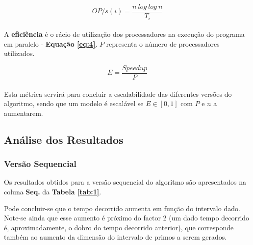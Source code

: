 \documentclass[a4paper]{article}
\begin{document}
\begin{equation}
\label{eq:3}
    OP/s(i) = \frac{n\ log\ log\ n}{T_i}
\end{equation}
\\

A \textbf{eficiência} é o rácio de utilização dos processadores na execução do programa em paralelo - \textbf{Equação \ref{eq:4}}. $P$ representa o número de processadores utilizados.

\begin{equation}
\label{eq:4}
    E = \frac{Speedup}{P}
\end{equation}
\\

Esta métrica servirá para concluir a escalabilidade das diferentes versões do algoritmo, sendo que um modelo é escalável se $E \in [0, 1]$ com $P$ e $n$ a aumentarem.


\pagebreak


\subsection{Análise dos Resultados}
 
\subsubsection{Versão Sequencial}

Os resultados obtidos para a versão sequencial do algoritmo são apresentados na coluna \textbf{Seq.} da \textbf{Tabela \ref{tab:1}}.

Pode concluir-se que o tempo decorrido aumenta em função do intervalo dado. Note-se ainda que esse aumento é próximo do factor 2 (um dado tempo decorrido é, aproximadamente, o dobro do tempo decorrido anterior), que corresponde também ao aumento da dimensão do intervalo de primos a serem gerados.
\end{document}
